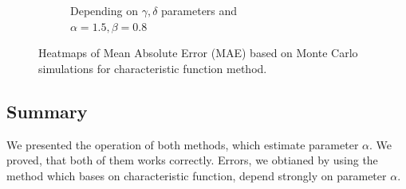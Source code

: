\documentclass{article}
\begin{document}
\begin{figure}[H]
\begin{subfigure}[r]{.5\textwidth}
				\caption{Depending on $\gamma, \delta$ parameters and \\$\alpha = 1.5, \beta = 0.8$}
			\end{subfigure}
			\caption{Heatmaps of Mean Absolute Error (MAE) based on Monte Carlo simulations for characteristic function method.}\label{heat4}
		\end{figure}
	
	\subsection{Summary}
	We presented the operation of both methods, which estimate parameter $\alpha$. We proved, that both of them works correctly. Errors, we obtianed by using the method which bases on characteristic function, depend strongly on parameter $\alpha$.
	 
	
\end{document}
